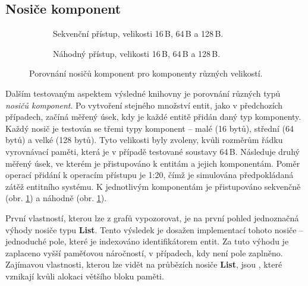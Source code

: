 \subsection{Nosiče komponent}

\begin{figure}[H]
	\centering
	\begin{subfigure}[b]{\textwidth}
		\caption{Sekvenční přístup, velikosti 16\,B, 64\,B a 128\,B.}\label{Fig:EVALHoldersSeq}
	\end{subfigure}
	\begin{subfigure}[b]{\textwidth}
		\caption{Náhodný přístup, velikosti 16\,B, 64\,B a 128\,B.}\label{Fig:EVALHoldersRand}
	\end{subfigure}
	\caption{Porovnání nosičů komponent pro komponenty různých velikostí.}
\end{figure}

Dalším testovaným aspektem výsledné knihovny je porovnání různých typů \emph{nosičů komponent}. Po vytvoření stejného množství entit, jako v předchozích případech, začíná měřený úsek, kdy je každé entitě přidán daný typ komponenty. Každý nosič je testován se třemi typy komponent -- malé (16 bytů), střední (64 bytů) a velké (128 bytů). Tyto velikosti byly zvoleny, kvůli rozměrům řádku vyrovnávací paměti, která je v případě testované soustavy 64\,B. Následuje druhý měřený úsek, ve kterém je přistupováno k entitám a jejich komponentám. Poměr operací přidání k operacím přístupu je 1:20, čímž je simulována předpokládaná zátěž entitního systému. K jednotlivým komponentám je přistupováno sekvenčně (obr. \ref{Fig:EVALHoldersSeq}) a náhodně (obr. \ref{Fig:EVALHoldersSeq}).

První vlastností, kterou lze z grafů vypozorovat, je na první pohled jednoznačná výhody nosiče typu \textbf{List}. Tento výsledek je dosažen implementací tohoto nosiče -- jednoduché pole, které je indexováno identifikátorem entit. Za tuto výhodu je zaplaceno vyšší paměťovou náročností, v případech, kdy není pole zaplněno. Zajímavou vlastnosti, kterou lze vidět na průbězích nosiče \textbf{List}, jsou , které vznikají kvůli alokaci většího bloku paměti.

